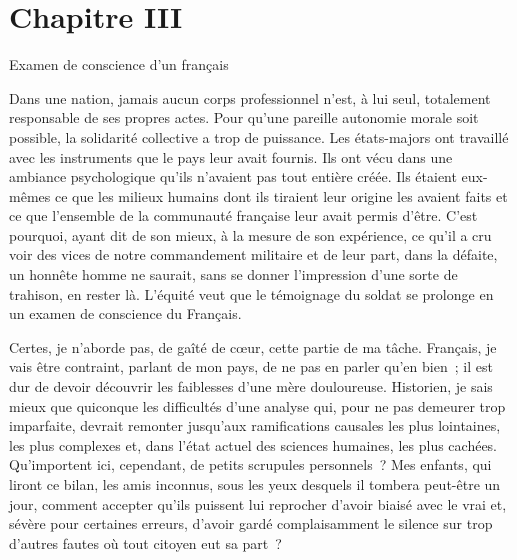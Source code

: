 \documentclass[french,twoside]{book} %
\newcommand\chapteropen{} %
\newcommand\chaptercont{} %
\begin{document}
\chapteropen
\renewcommand{\leftmark}{Chapitre III}
\chapter[Chapitre III]{Chapitre III}

\chaptercont

\begin{center}
Examen de conscience d’un français\end{center}
\noindent   Dans une nation, jamais aucun corps professionnel n’est, à lui seul, totalement responsable de ses propres actes. Pour qu’une pareille autonomie morale soit possible, la solidarité collective a trop de puissance. Les états-majors ont travaillé avec les instruments que le pays leur avait fournis. Ils ont vécu dans une ambiance psychologique qu’ils n’avaient pas tout entière créée. Ils étaient eux-mêmes ce que les milieux humains dont ils tiraient leur origine les avaient faits et ce que l’ensemble de la communauté française leur avait permis d’être. C’est pourquoi, ayant dit de son mieux, à la mesure de son expérience, ce qu’il a cru voir des vices de notre commandement militaire et de leur part, dans la défaite, un honnête homme ne saurait, sans se donner l’impression d’une sorte de trahison, en rester là. L’équité veut que le témoignage du soldat se prolonge en un examen de conscience du Français.\par
Certes, je n’aborde pas, de gaîté de cœur, cette partie de ma tâche. Français, je vais être contraint, parlant de mon pays, de ne pas en parler qu’en bien ; il est dur de devoir découvrir les faiblesses d’une mère douloureuse. Historien, je sais mieux que quiconque les difficultés d’une analyse qui, pour ne pas demeurer trop imparfaite, devrait remonter jusqu’aux ramifications causales les plus lointaines, les plus complexes et, dans l’état actuel des sciences humaines, les plus cachées. Qu’importent ici, cependant, de petits scrupules personnels ? Mes enfants,   qui liront ce bilan, les amis inconnus, sous les yeux desquels il tombera peut-être un jour, comment accepter qu’ils puissent lui reprocher d’avoir biaisé avec le vrai et, sévère pour certaines erreurs, d’avoir gardé complaisamment le silence sur trop d’autres fautes où tout citoyen eut sa part ?\par
\end{document}

